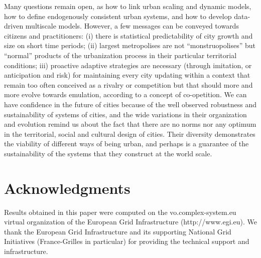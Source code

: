 \documentclass[11pt]{article}
\begin{document}
Many questions remain open, as how to link urban scaling and dynamic models, how to define endogenously consistent urban systems, and how to develop data-driven multiscale models. However, a few messages can be conveyed towards citizens and practitioners: (i) there is statistical predictability of city growth and size on short time periods; (ii) largest metropolises are not “monstruopolises” but “normal” products of the urbanization process in their particular territorial conditions; iii) proactive adaptive strategies are necessary (through imitation, or anticipation and risk) for maintaining every city updating within a context that remain too often conceived as a rivalry or competition but that should more and more evolve towards emulation, according to a concept of co-opetition. We can have confidence in the future of cities because of the well observed robustness and sustainability of systems of cities, and the wide variations in their organization and evolution remind us about the fact that there are no norms nor any optimum in the territorial, social and cultural design of cities. Their diversity demonstrates the viability of different ways of being urban, and perhaps is a guarantee of the sustainability of the systems that they construct at the world scale.






\section*{Acknowledgments}

Results obtained in this paper were computed on the vo.complex-system.eu virtual organization of the European Grid Infrastructure (http://www.egi.eu). We thank the European Grid Infrastructure and its supporting National Grid Initiatives (France-Grilles in particular) for providing the technical support and infrastructure.
\end{document}
